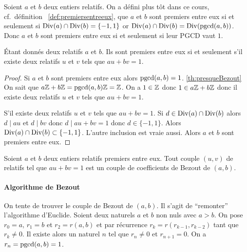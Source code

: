 Soient \(a\) et \(b\) deux entiers relatifs. On a défini plus tôt dans ce cours, cf.\ définition~
\ref{def:premiersentreeux}, que \(a\) et \(b\) sont premiers entre eux si et seulement si \(\operatorname{Div}(a) \cap \operatorname{Div}(b)=\{-1,1\}\) or \(\operatorname{Div}(a) \cap \operatorname{Div}(b) = \operatorname{Div}(\operatorname{pgcd}(a,b))\). Donc \(a\) et \(b\) sont premiers entre eux si et seulement si leur PGCD vaut \(1\).

\begin{theo}
  Étant donnés deux relatifs \(a\) et \(b\). Ils sont premiers entre eux si et seulement s'il existe deux relatifs \(u\) et \(v\) tels que \(au+bv=1\).
\end{theo}
\begin{proof}
  Si \(a\) et \(b\) sont premiers entre eux alors \(\operatorname{pgcd}(a,b) =1\). %
  \ref{th:presqueBezout}
  On sait que \(a\mathbb{Z}+b\mathbb{Z}=\operatorname{pgcd}(a,b)\mathbb{Z}=\mathbb{Z}\). On a \(1 \in \mathbb{Z}\) donc \(1 \in a\mathbb{Z}+b\mathbb{Z}\) donc il existe deux relatifs \(u\) et \(v\) tels que \(au+bv=1\).

  S'il existe deux relatifs \(u\) et \(v\) tels que \(au+bv=1\). Si \(d \in \operatorname{Div}(a) \cap \operatorname{Div}(b)\) alors \(d \mid au\) et \(d \mid bv\) donc \(d \mid au+bv=1\) donc \(d \in \{-1,1\}\). Alors \(\operatorname{Div}(a) \cap \operatorname{Div}(b) \subset \{-1,1\}\). L'autre inclusion est vraie aussi. Alors \(a\) et \(b\) sont premiers entre eux.
\end{proof}

\begin{defdef}
  Soient \(a\) et \(b\) deux entiers relatifs premiers entre eux. Tout couple \((u,v)\) de relatifs tel que \(au+bv=1\) est un couple de coefficients de Bezout de \((a,b)\).
\end{defdef}

\paragraph{Algorithme de Bezout}

On tente de trouver le couple de Bezout de \((a,b)\). Il s'agit de ``remonter'' l'algorithme d'Euclide. Soient deux naturels \(a\) et \(b\) non nuls avec \(a>b\). On pose \(r_0=a\), \(r_1=b\) et \(r_2=r(a,b)\) et par récurrence \(r_k=r(r_{k-1}, r_{k-2})\) tant que \(r_k \neq 0\). Il existe alors un naturel \(n\) tel que \(r_n \neq 0\) et \(r_{n+1}=0\). On a \(r_n=\operatorname{pgcd}(a,b)=1\).

